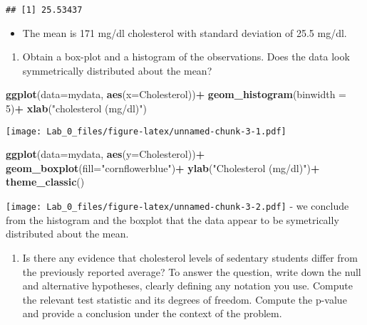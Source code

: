 \documentclass[]{article}
\newenvironment{Shaded}{\begin{snugshade}}{\end{snugshade}}
\newcommand{\KeywordTok}[1]{\textcolor[rgb]{0.13,0.29,0.53}{\textbf{#1}}}
\newcommand{\DataTypeTok}[1]{\textcolor[rgb]{0.13,0.29,0.53}{#1}}
\newcommand{\DecValTok}[1]{\textcolor[rgb]{0.00,0.00,0.81}{#1}}
\newcommand{\StringTok}[1]{\textcolor[rgb]{0.31,0.60,0.02}{#1}}
\newcommand{\OperatorTok}[1]{\textcolor[rgb]{0.81,0.36,0.00}{\textbf{#1}}}
\newcommand{\NormalTok}[1]{#1}
\providecommand{\tightlist}{%
  \setlength{\itemsep}{0pt}\setlength{\parskip}{0pt}}
\begin{document}
\begin{verbatim}
## [1] 25.53437
\end{verbatim}

\begin{itemize}
\tightlist
\item
  The mean is 171 mg/dl cholesterol with standard deviation of 25.5
  mg/dl.
\end{itemize}

\begin{enumerate}
\def\labelenumi{\alph{enumi})}
\setcounter{enumi}{1}
\tightlist
\item
  Obtain a box-plot and a histogram of the observations. Does the data
  look symmetrically distributed about the mean?
\end{enumerate}

\begin{Shaded}
\begin{Highlighting}[]
\KeywordTok{ggplot}\NormalTok{(}\DataTypeTok{data=}\NormalTok{mydata, }\KeywordTok{aes}\NormalTok{(}\DataTypeTok{x=}\NormalTok{Cholesterol))}\OperatorTok{+}
\StringTok{       }\KeywordTok{geom_histogram}\NormalTok{(}\DataTypeTok{binwidth =} \DecValTok{5}\NormalTok{)}\OperatorTok{+}
\StringTok{       }\KeywordTok{xlab}\NormalTok{(}\StringTok{"cholesterol (mg/dl)"}\NormalTok{)}
\end{Highlighting}
\end{Shaded}

\texttt{[image: Lab\_0\_files/figure-latex/unnamed-chunk-3-1.pdf]}

\begin{Shaded}
\begin{Highlighting}[]
\KeywordTok{ggplot}\NormalTok{(}\DataTypeTok{data=}\NormalTok{mydata, }\KeywordTok{aes}\NormalTok{(}\DataTypeTok{y=}\NormalTok{Cholesterol))}\OperatorTok{+}
\StringTok{       }\KeywordTok{geom_boxplot}\NormalTok{(}\DataTypeTok{fill=}\StringTok{"cornflowerblue"}\NormalTok{)}\OperatorTok{+}
\StringTok{       }\KeywordTok{ylab}\NormalTok{(}\StringTok{"Cholesterol (mg/dl)"}\NormalTok{)}\OperatorTok{+}
\StringTok{       }\KeywordTok{theme_classic}\NormalTok{()}
\end{Highlighting}
\end{Shaded}

\texttt{[image: Lab\_0\_files/figure-latex/unnamed-chunk-3-2.pdf]} - we
conclude from the histogram and the boxplot that the data appear to be
symetrically distributed about the mean.

\begin{enumerate}
\def\labelenumi{\alph{enumi})}
\setcounter{enumi}{2}
\tightlist
\item
  Is there any evidence that cholesterol levels of sedentary students
  differ from the previously reported average? To answer the question,
  write down the null and alternative hypotheses, clearly defining any
  notation you use. Compute the relevant test statistic and its degrees
  of freedom. Compute the p-value and provide a conclusion under the
  context of the problem.
\end{enumerate}
\end{document}
